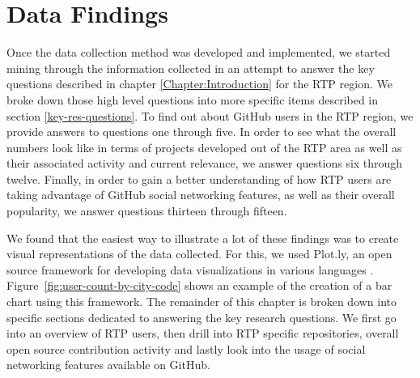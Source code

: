 \chapter{Data Findings}
\label{Chapter:Findings}

Once the data collection method was developed and implemented, we started mining through the information collected in an attempt to answer the key questions described in chapter \ref{Chapter:Introduction} for the RTP region. We broke down those high level questions into more specific items described in section \ref{key-res-questions}. To find out about GitHub users in the RTP region, we provide answers to questions one through five. In order to see what the overall numbers look like in terms of projects developed out of the RTP area as well as their associated activity and current relevance, we answer questions six through twelve. Finally, in order to gain a better understanding of how RTP users are taking advantage of GitHub social networking features, as well as their overall popularity, we answer questions thirteen through fifteen.

We found that the easiest way to illustrate a lot of these findings was to create visual representations of the data collected. For this, we used Plot.ly, an open source framework for developing data visualizations in various languages \cite{_plotly_????}. Figure~\ref{fig:user-count-by-city-code} shows an example of the creation of a bar chart using this framework. The remainder of this chapter is broken down into specific sections dedicated to answering the key research questions. We first go into an overview of RTP users, then drill into RTP specific repositories, overall open source contribution activity and lastly look into the usage of social networking features available on GitHub.

